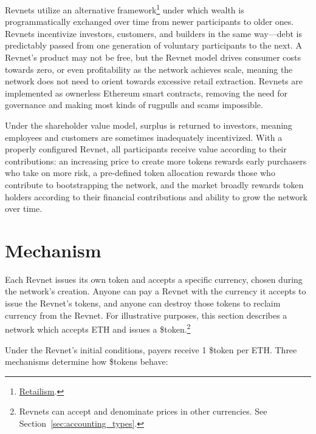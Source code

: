 \documentclass{article}
\begin{document}
Revnets utilize an alternative framework\footnote{\href{https://jango.eth.limo/9E01E72C-6028-48B7-AD04-F25393307132}{Retailism}.} under which wealth is programmatically exchanged over time from newer participants to older ones. Revnets incentivize investors, customers, and builders in the same way---debt is predictably passed from one generation of voluntary participants to the next. A Revnet's product may not be free, but the Revnet model drives consumer costs towards zero, or even profitability as the network achieves scale, meaning the network does not need to orient towards excessive retail extraction. Revnets are implemented as ownerless Ethereum smart contracts, removing the need for governance and making most kinds of rugpulls and scams impossible.

Under the shareholder value model, surplus is returned to investors, meaning employees and customers are sometimes inadequately incentivized. With a properly configured Revnet, all participants receive value according to their contributions: an increasing price to create more tokens rewards early purchasers who take on more risk, a pre-defined token allocation rewards those who contribute to bootstrapping the network, and the market broadly rewards token holders according to their financial contributions and ability to grow the network over time.

\section{Mechanism}

Each Revnet issues its own token and accepts a specific currency, chosen during the network's creation. Anyone can pay a Revnet with the currency it accepts to issue the Revnet's tokens, and anyone can destroy those tokens to reclaim currency from the Revnet. For illustrative purposes, this section describes a network which accepts ETH and issues a \$token.\footnote{Revnets can accept and denominate prices in other currencies. See Section~\ref{sec:accounting_types}.}

Under the Revnet's initial conditions, payers receive 1 \$token per ETH. Three mechanisms determine how \$tokens behave:
\end{document}
